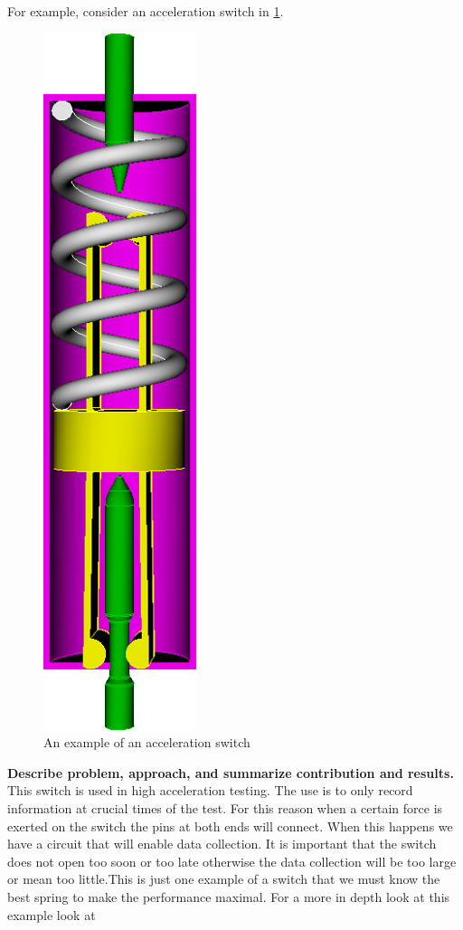 \documentclass[10pt]{article}
\begin{document}
For example, consider an acceleration switch in \ref{Acceleration Switch}. 

		\begin{figure}[h]
		 \begin{center}\includegraphics[scale=.2]{Acceleration_Switch.png}\end{center}
		 \caption{An example of an acceleration switch}
		 \label{Acceleration Switch}
		 
		 \end{figure}
\textbf{Describe problem, approach, and summarize contribution and results.}
This switch is used in high acceleration testing. The use is to only record information at crucial times of the test. For this reason when a certain force is exerted on the switch the pins at both ends will connect. When this happens we have a circuit that will enable data collection. It is important that the switch does not open too soon or too late otherwise the data collection will be too large or mean too little.This is just one example of a switch that we must know the best spring to make the performance maximal. For a more in depth look at this example look at \cite{IMSM2010}
\end{document}
